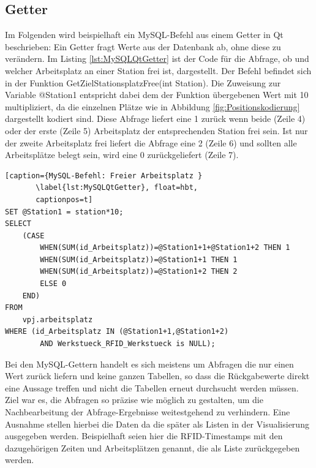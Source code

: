 \subsection{Getter}\label{kap:MySQLGetter}
Im Folgenden wird beispielhaft ein MySQL-Befehl aus einem Getter in Qt beschrieben: Ein Getter fragt Werte aus der Datenbank ab, ohne diese zu verändern.
Im Listing \ref{lst:MySQLQtGetter} ist der Code für die Abfrage, ob und welcher Arbeitsplatz an einer Station frei ist, dargestellt. Der Befehl befindet sich in der Funktion GetZielStationsplatzFree(int Station). Die Zuweisung zur Variable \glqq @Station1\grqq{} entspricht dabei dem der Funktion übergebenen Wert mit 10 multipliziert, da die einzelnen Plätze wie in Abbildung \ref{fig:Positionskodierung} dargestellt kodiert sind. Diese Abfrage liefert eine 1 zurück wenn beide (Zeile 4) oder der erste (Zeile 5) Arbeitsplatz der entsprechenden Station frei sein. Ist nur der zweite Arbeitsplatz frei liefert die Abfrage eine 2 (Zeile 6) und sollten alle Arbeitsplätze belegt sein, wird eine 0 zurückgeliefert (Zeile 7).
 

\begin{lstlisting}[caption={MySQL-Befehl: Freier Arbeitsplatz }
       \label{lst:MySQLQtGetter}, float=hbt,
       captionpos=t] 
SET @Station1 = station*10; 
SELECT
    (CASE
        WHEN(SUM(id_Arbeitsplatz))=@Station1+1+@Station1+2 THEN 1 
        WHEN(SUM(id_Arbeitsplatz))=@Station1+1 THEN 1 
        WHEN(SUM(id_Arbeitsplatz))=@Station1+2 THEN 2 
        ELSE 0 
    END) 
FROM 
    vpj.arbeitsplatz 
WHERE (id_Arbeitsplatz IN (@Station1+1,@Station1+2) 
        AND Werkstueck_RFID_Werkstueck is NULL);
\end{lstlisting}

Bei den MySQL-Gettern handelt es sich meistens um Abfragen die nur einen Wert zurück liefern und keine ganzen Tabellen, so dass die Rückgabewerte direkt eine Aussage treffen und nicht die  Tabellen erneut durchsucht werden müssen. Ziel war es, die Abfragen so präzise wie möglich zu gestalten, um die Nachbearbeitung der Abfrage-Ergebnisse weitestgehend zu verhindern. Eine Ausnahme stellen hierbei die Daten da die später als Listen in der Visualisierung ausgegeben werden. Beispielhaft seien hier die RFID-Timestamps mit den dazugehörigen Zeiten und Arbeitsplätzen genannt, die als Liste zurückgegeben werden.

